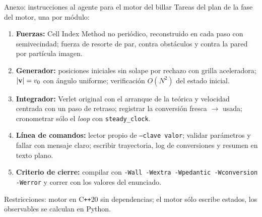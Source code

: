 \begin{frame}{Anexo: instrucciones al agente para el motor del billar}
  \footnotesize
  Tareas del plan de la fase del motor, una por módulo:
  \begin{enumerate}
    \item \textbf{Fuerzas:} Cell Index Method no periódico, reconstruido en cada paso con semivecindad; fuerza de resorte de par, contra obstáculos y contra la pared por partícula imagen.
    \item \textbf{Generador:} posiciones iniciales sin solape por rechazo con grilla aceleradora; $|\mathbf{v}| = v_0$ con ángulo uniforme; verificación $O(N^2)$ del estado inicial.
    \item \textbf{Integrador:} Verlet original con el arranque de la teórica y velocidad centrada con un paso de retraso; registrar la conversión fresca $\to$ usada; cronometrar sólo el \emph{loop} con \texttt{steady\_clock}.
    \item \textbf{Línea de comandos:} lector propio de \texttt{--clave valor}; validar parámetros y fallar con mensaje claro; escribir trayectoria, log de conversiones y resumen en texto plano.
    \item \textbf{Criterio de cierre:} compilar con \texttt{-Wall -Wextra -Wpedantic -Wconversion -Werror} y correr con los valores del enunciado.
  \end{enumerate}
  \vspace{0.3em}
  Restricciones: motor en C\texttt{++}20 sin dependencias; el motor sólo escribe estados, los observables se calculan en Python.
\end{frame}



